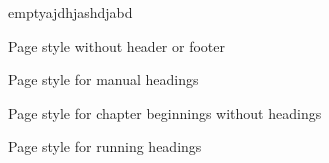 \usepackage{blindtext}
\usepackage{scrextend}
\begin{labeling}[~--]{emptyajdhjashdjabd}
\item[emptyajdhjashdjabd]
Page style without header or footer
\item[myheadings]
Page style for manual headings
\item[plain]
Page style for chapter beginnings without headings
\item[headings]
Page style for running headings
\end{labeling}

